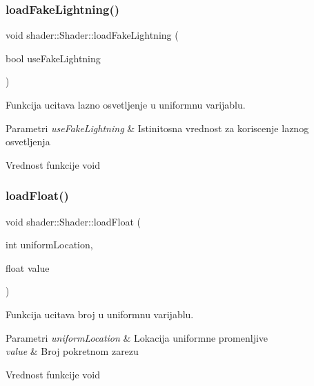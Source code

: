 \subsubsection{\texorpdfstring{load\+Fake\+Lightning()}{loadFakeLightning()}}
{\footnotesize\ttfamily void shader\+::\+Shader\+::load\+Fake\+Lightning (\begin{DoxyParamCaption}\item[{bool}]{use\+Fake\+Lightning }\end{DoxyParamCaption})}



Funkcija ucitava lazno osvetljenje u uniformnu varijablu. 


\begin{DoxyParams}{Parametri}
{\em use\+Fake\+Lightning} & Istinitosna vrednost za koriscenje laznog osvetljenja \\
\hline
\end{DoxyParams}
\begin{DoxyReturn}{Vrednost funkcije}
void 
\end{DoxyReturn}
\mbox{\label{classshader_1_1Shader_ae9dde8789a747d037f136c91a8cc03b6}} 
\subsubsection{\texorpdfstring{load\+Float()}{loadFloat()}}
{\footnotesize\ttfamily void shader\+::\+Shader\+::load\+Float (\begin{DoxyParamCaption}\item[{int}]{uniform\+Location,  }\item[{float}]{value }\end{DoxyParamCaption})}



Funkcija ucitava broj u uniformnu varijablu. 


\begin{DoxyParams}{Parametri}
{\em uniform\+Location} & Lokacija uniformne promenljive \\
\hline
{\em value} & Broj pokretnom zarezu \\
\hline
\end{DoxyParams}
\begin{DoxyReturn}{Vrednost funkcije}
void 
\end{DoxyReturn}
\mbox{\label{classshader_1_1Shader_a06b6080ebb6c1735747771678dbec4b6}} 
